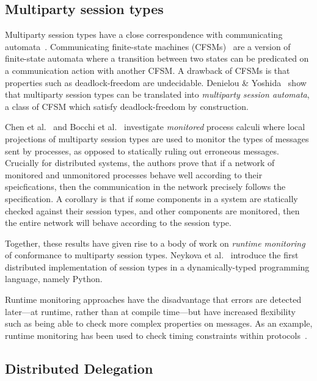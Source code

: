 \documentclass[
graybox,
envcountchap
]{svmult}
\begin{document}
\begin{bibunit}
  \subsection{Multiparty session types}
  Multiparty session types have a close correspondence with communicating
  automata~\cite{DenielouY12:mpst-automata}. Communicating finite-state
  machines (CFSMs)~\cite{BrandZ83:cfsms} are a version of finite-state automata
  where a transition between two states can be predicated on a communication
  action with another CFSM. A drawback of CFSMs is that properties such as
  deadlock-freedom are undecidable. Denielou \&
  Yoshida~\cite{DenielouY12:mpst-automata} show that multiparty session types
  can be translated into \emph{multiparty session automata}, a class of CFSM
  which satisfy deadlock-freedom by construction.

  Chen et al.~\cite{ChenBDHY11:monitoring} and Bocchi et
  al.~\cite{BocchiCDHY13:monitoring} investigate \emph{monitored} process
  calculi where local projections of multiparty session types are used to
  monitor the types of messages sent by processes, as opposed to statically
  ruling out erroneous messages. Crucially for distributed systems,
  the authors prove that if a network of monitored and unmonitored processes
  behave well according to their speicfications, then the communication in the
  network precisely follows the specification. A corollary is that if some
  components in a system are statically checked against their session types, and
  other components are monitored, then the entire network will behave according
  to the session type.

  Together, these results have given rise to a body of work on \emph{runtime
  monitoring} of conformance to multiparty session types. Neykova et
  al.~\cite{NeykovaYH13:spy} introduce the first distributed implementation of
  session types in a dynamically-typed programming language, namely Python.

  Runtime monitoring approaches have the disadvantage that errors are detected
  later---at runtime, rather than at compile time---but have increased
  flexibility such as being able to check more complex properties on messages.
  As an example, runtime monitoring has been used to check timing
  constraints within protocols~\cite{NeykovaBY17:timed-monitoring}.

  \subsection{Distributed Delegation}\label{sec:distrib-deleg:difficulties}

\end{bibunit}
\end{document}
